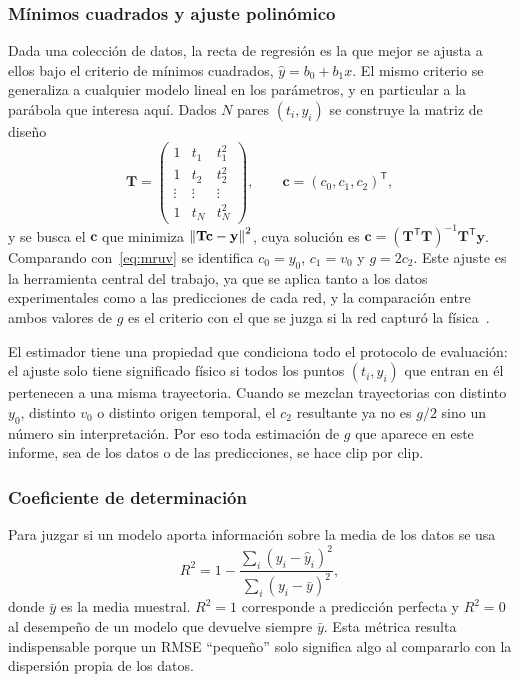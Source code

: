 \documentclass[titlepage,11pt]{article}
\begin{document}
\subsubsection{Mínimos cuadrados y ajuste polinómico}
\label{subsubsec:minimoscuadrados}
Dada una colección de datos, la recta de regresión es la que mejor se ajusta a
ellos bajo el criterio de mínimos cuadrados, $\hat y = b_0+b_1x$. El mismo
criterio se generaliza a cualquier modelo lineal en los parámetros, y en
particular a la parábola que interesa aquí. Dados $N$ pares $(t_i,y_i)$ se
construye la matriz de diseño
\begin{equation}
  \mathbf{T} =
  \begin{pmatrix}
    1 & t_1 & t_1^2\\
    1 & t_2 & t_2^2\\
    \vdots & \vdots & \vdots\\
    1 & t_N & t_N^2
  \end{pmatrix},
  \qquad
  \mathbf{c} = (c_0,c_1,c_2)^{\mathsf T},
\end{equation}
y se busca el $\mathbf{c}$ que minimiza $\norm{\mathbf{T}\mathbf{c}-\mathbf{y}}^2$,
cuya solución es $\mathbf{c}=(\mathbf{T}^{\mathsf T}\mathbf{T})^{-1}\mathbf{T}^{\mathsf T}\mathbf{y}$.
Comparando con~\eqref{eq:mruv} se identifica $c_0=y_0$, $c_1=v_0$ y
$g=2c_2$. Este ajuste es la herramienta central del trabajo, ya que se aplica
tanto a los datos experimentales como a las predicciones de cada red, y la
comparación entre ambos valores de $g$ es el criterio con el que se juzga si la
red capturó la física~\cite{triola_2018_estadstica}.

El estimador tiene una propiedad que condiciona todo el protocolo de
evaluación: el ajuste solo tiene significado físico si todos los puntos
$(t_i,y_i)$ que entran en él pertenecen a una misma trayectoria. Cuando se
mezclan trayectorias con distinto $y_0$, distinto $v_0$ o distinto origen
temporal, el $c_2$ resultante ya no es $g/2$ sino un número sin interpretación.
Por eso toda estimación de $g$ que aparece en este informe, sea de los datos o
de las predicciones, se hace clip por clip.

\subsubsection{Coeficiente de determinación}
Para juzgar si un modelo aporta información sobre la media de los datos
se usa
\begin{equation}
  R^2 = 1 - \frac{\sum_i (y_i-\hat y_i)^2}{\sum_i (y_i-\bar y)^2},
  \label{eq:r2}
\end{equation}
donde $\bar y$ es la media muestral. $R^2=1$ corresponde a predicción perfecta
y $R^2=0$ al desempeño de un modelo que devuelve siempre $\bar y$. Esta métrica
resulta indispensable porque un RMSE \enquote{pequeño} solo significa algo al
compararlo con la dispersión propia de los datos.
\end{document}
